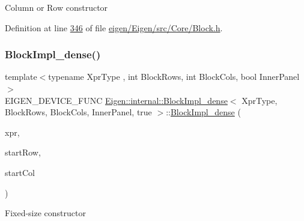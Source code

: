 Column or Row constructor 

Definition at line \hyperlink{eigen_2_eigen_2src_2_core_2_block_8h_source_l00346}{346} of file \hyperlink{eigen_2_eigen_2src_2_core_2_block_8h_source}{eigen/\+Eigen/src/\+Core/\+Block.\+h}.

\mbox{\label{class_eigen_1_1internal_1_1_block_impl__dense_3_01_xpr_type_00_01_block_rows_00_01_block_cols_00_01_inner_panel_00_01true_01_4_aaa47737cd19396275d5bcb6d9520e49f}} 
\subsubsection{\texorpdfstring{Block\+Impl\+\_\+dense()}{BlockImpl\_dense()}\hspace{0.1cm}{\footnotesize\ttfamily [2/6]}}
{\footnotesize\ttfamily template$<$typename Xpr\+Type , int Block\+Rows, int Block\+Cols, bool Inner\+Panel$>$ \\
E\+I\+G\+E\+N\+\_\+\+D\+E\+V\+I\+C\+E\+\_\+\+F\+U\+NC \hyperlink{class_eigen_1_1internal_1_1_block_impl__dense}{Eigen\+::internal\+::\+Block\+Impl\+\_\+dense}$<$ Xpr\+Type, Block\+Rows, Block\+Cols, Inner\+Panel, true $>$\+::\hyperlink{class_eigen_1_1internal_1_1_block_impl__dense}{Block\+Impl\+\_\+dense} (\begin{DoxyParamCaption}\item[{Xpr\+Type \&}]{xpr,  }\item[{\hyperlink{namespace_eigen_a62e77e0933482dafde8fe197d9a2cfde}{Index}}]{start\+Row,  }\item[{\hyperlink{namespace_eigen_a62e77e0933482dafde8fe197d9a2cfde}{Index}}]{start\+Col }\end{DoxyParamCaption})\hspace{0.3cm}{\ttfamily [inline]}}

Fixed-\/size constructor 

